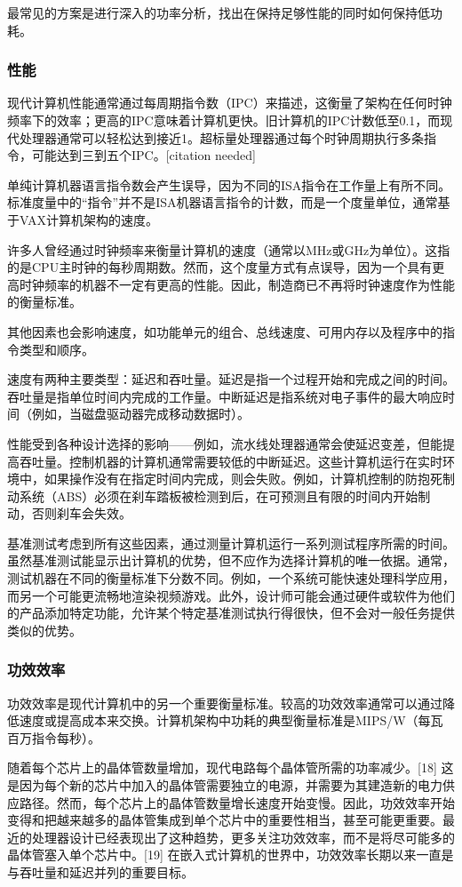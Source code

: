 最常见的方案是进行深入的功率分析，找出在保持足够性能的同时如何保持低功耗。
\subsubsection{性能}  
现代计算机性能通常通过每周期指令数（IPC）来描述，这衡量了架构在任何时钟频率下的效率；更高的IPC意味着计算机更快。旧计算机的IPC计数低至0.1，而现代处理器通常可以轻松达到接近1。超标量处理器通过每个时钟周期执行多条指令，可能达到三到五个IPC。[citation needed]

单纯计算机器语言指令数会产生误导，因为不同的ISA指令在工作量上有所不同。标准度量中的“指令”并不是ISA机器语言指令的计数，而是一个度量单位，通常基于VAX计算机架构的速度。

许多人曾经通过时钟频率来衡量计算机的速度（通常以MHz或GHz为单位）。这指的是CPU主时钟的每秒周期数。然而，这个度量方式有点误导，因为一个具有更高时钟频率的机器不一定有更高的性能。因此，制造商已不再将时钟速度作为性能的衡量标准。

其他因素也会影响速度，如功能单元的组合、总线速度、可用内存以及程序中的指令类型和顺序。

速度有两种主要类型：延迟和吞吐量。延迟是指一个过程开始和完成之间的时间。吞吐量是指单位时间内完成的工作量。中断延迟是指系统对电子事件的最大响应时间（例如，当磁盘驱动器完成移动数据时）。

性能受到各种设计选择的影响——例如，流水线处理器通常会使延迟变差，但能提高吞吐量。控制机器的计算机通常需要较低的中断延迟。这些计算机运行在实时环境中，如果操作没有在指定时间内完成，则会失败。例如，计算机控制的防抱死制动系统（ABS）必须在刹车踏板被检测到后，在可预测且有限的时间内开始制动，否则刹车会失效。

基准测试考虑到所有这些因素，通过测量计算机运行一系列测试程序所需的时间。虽然基准测试能显示出计算机的优势，但不应作为选择计算机的唯一依据。通常，测试机器在不同的衡量标准下分数不同。例如，一个系统可能快速处理科学应用，而另一个可能更流畅地渲染视频游戏。此外，设计师可能会通过硬件或软件为他们的产品添加特定功能，允许某个特定基准测试执行得很快，但不会对一般任务提供类似的优势。
\subsubsection{功效效率}  
功效效率是现代计算机中的另一个重要衡量标准。较高的功效效率通常可以通过降低速度或提高成本来交换。计算机架构中功耗的典型衡量标准是MIPS/W（每瓦百万指令每秒）。

随着每个芯片上的晶体管数量增加，现代电路每个晶体管所需的功率减少。[18] 这是因为每个新的芯片中加入的晶体管需要独立的电源，并需要为其建造新的电力供应路径。然而，每个芯片上的晶体管数量增长速度开始变慢。因此，功效效率开始变得和把越来越多的晶体管集成到单个芯片中的重要性相当，甚至可能更重要。最近的处理器设计已经表现出了这种趋势，更多关注功效效率，而不是将尽可能多的晶体管塞入单个芯片中。[19] 在嵌入式计算机的世界中，功效效率长期以来一直是与吞吐量和延迟并列的重要目标。
